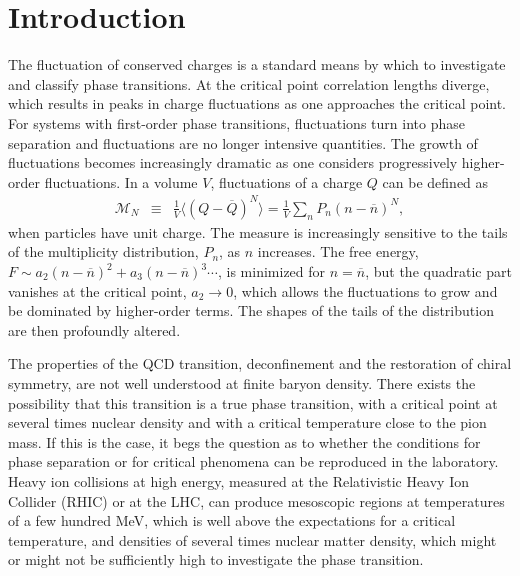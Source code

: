 
\section{Introduction}\label{sec:intro}

The fluctuation of conserved charges is a standard means by which to investigate and classify phase transitions. At the critical point correlation lengths diverge, which results in peaks in charge fluctuations as one approaches the critical point. For systems with first-order phase transitions, fluctuations turn into phase separation and fluctuations are no longer intensive quantities. The growth of fluctuations becomes increasingly dramatic as one considers progressively higher-order fluctuations. In a volume $V$, fluctuations of a charge $Q$ can be defined as
\begin{eqnarray}\label{eq:kappadef}
\mathcal{M}_N&\equiv&\frac{1}{V}\langle(Q-\overline{Q})^N\rangle=\frac{1}{V}\sum_n P_n(n-\overline{n})^N,
\end{eqnarray}
when particles have unit charge. The measure is increasingly sensitive to the tails of the multiplicity distribution, $P_n$, as $n$ increases. The free energy, $F\sim a_2(n-\overline{n})^2 + a_3(n-\overline{n})^3\cdots$, is minimized for $n=\overline{n}$, but the quadratic part vanishes at the critical point, $a_2\rightarrow 0$, which allows the fluctuations to grow and be dominated by higher-order terms. The shapes of the tails of the distribution are then profoundly altered. 

The properties of the QCD  transition, deconfinement and the restoration of chiral symmetry, are not well understood at finite baryon density. There exists the possibility that this transition is a true phase transition, with a critical point at several times nuclear density and with a critical temperature close to the pion mass. If this is the case, it begs the question as to whether the conditions for phase separation or for critical phenomena can be reproduced in the laboratory. Heavy ion collisions at high energy, measured at the Relativistic Heavy Ion Collider (RHIC) or at the LHC, can produce mesoscopic regions at temperatures of a few hundred MeV, which is well above the expectations for a critical temperature, and densities of several times nuclear matter density, which might or might not be sufficiently high to investigate the phase transition. 

